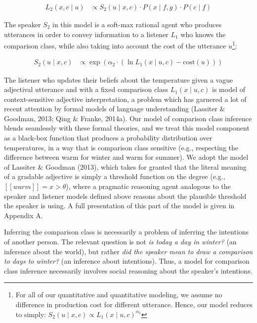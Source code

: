 \documentclass[doc]{apa6}
\begin{document}
\begin{align}
L_2(x, c \mid u) &\propto S_2(u \mid x, c) \cdot P(x \mid f, g) \cdot P(c \mid f) \label{eq:L2} 
\end{align}

The speaker $S_2$ in this model is a soft-max rational agent who produces utterances in order to convey information to a listener $L_{1}$ who knows the comparison class, while also taking into account the cost of the utterance $u$\footnote{For all of our quantitative and quantitative modeling, we assume no difference in production cost for different utterance. Hence, our model reduces to simply: $S_2(u \mid x, c) \propto L_{1}(x \mid u, c)^{ \alpha_{2}}$}: 

\begin{align}
S_2(u \mid x, c) &\propto \exp{(\alpha_{2} \cdot (\ln L_{1}(x \mid u, c) - \text{cost}(u) ))}\label{eq:S2} 
\end{align}

The listener who updates their beliefs about the temperature given a vague adjectival utterance and with a fixed comparison class $L_{1}(x \mid u, c)$ is model of context-sensitive adjective interpretation, a problem which has garnered a lot of recent attention by formal models of language understanding (Lassiter \& Goodman, 2013; Qing \& Franke, 2014a).
Our model of comparison class inference blends seamlessly with these formal theories, and we treat this model component as a black-box function that produces a probability distribution over temperatures, in a way that is comparison class sensitive (e.g., respecting the difference between warm for winter and warm for summer). 
We adopt the model of Lassiter \& Goodman (2013), which takes for granted  that the literal meaning of a gradable adjective is simply a threshold function on the degree (e.g., \([\![warm]\!] = x > \theta\)), where a pragmatic reasoning agent analogous to the speaker and listener models defined above reasons about the plausible threshold the speaker is using. A full presentation of this  part of the model is given in Appendix A.



Inferring the comparison class is necessarily a problem of inferring the intentions of another person.
The relevant question is not \emph{is today a day in winter?} (an inference about the world), but rather \emph{did the speaker mean to draw a comparison to days to winter?} (an inference about intentions).
Thus, a model for comparison class inference necessarily involves social reasoning about the speaker's intentions.
\end{document}

